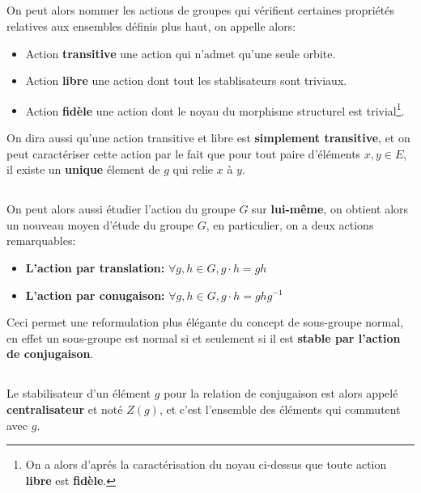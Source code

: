 \subsection*{}
On peut alors nommer les actions de groupes qui vérifient certaines propriétés relatives aux ensembles définis plus haut, on appelle alors:
\begin{itemize}
   \item Action \textbf{transitive} une action qui n'admet qu'une seule orbite.
   \item Action \textbf{libre} une action dont tout les stablisateurs sont triviaux.
   \item Action \textbf{fidèle} une action dont le noyau du morphisme structurel est trivial\footnote[1]{On a alors d'aprés la caractérisation du noyau ci-dessus que toute action \textbf{libre} est \textbf{fidèle}.}.
\end{itemize}
On dira aussi qu'une action transitive et libre est \textbf{simplement transitive}, et on peut caractériser cette action par le fait que pour tout paire d'éléments \( x, y \in E\), il existe un \textbf{unique} élement de \( g \) qui relie \( x \) à \( y \).
\subsection*{}
On peut alors aussi étudier l'action du groupe \( G \) sur \textbf{lui-même}, on obtient alors un nouveau moyen d'étude du groupe \( G \), en particulier, on a deux actions remarquables:
\begin{itemize}
   \item \textbf{L'action par translation:} \( \forall g, h \in G, g \cdot h = gh\)
   \item \textbf{L'action par conugaison:} \( \forall g, h \in G, g \cdot h = ghg^{-1}\)
\end{itemize}
Ceci permet une reformulation plus élégante du concept de sous-groupe normal, en effet un sous-groupe est normal si et seulement si il est \textbf{stable par l'action de conjugaison}.
\pagebreak 
\subsection*{}
Le stabilisateur d'un élément \( g \) pour la relation de conjugaison est alors appelé \textbf{centralisateur} et noté \( Z(g) \), et c'est l'ensemble des éléments qui commutent avec \( g \).\<

